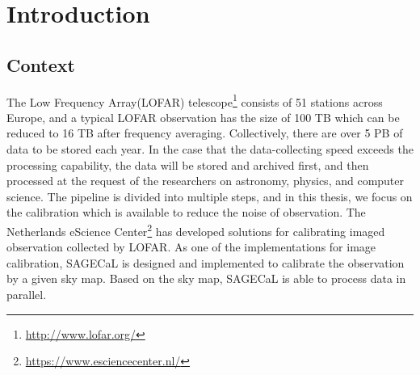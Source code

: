 
\chapter{Introduction}

\ifpdf
    \graphicspath{{1_introduction/figures/PNG/}{1_introduction/figures/PDF/}{1_introduction/figures/}}
\else
    \graphicspath{{1_introduction/figures/EPS/}{1_introduction/figures/}}
\fi







\section{Context} \label{section:intro.contex}
The Low Frequency Array(LOFAR) telescope\footnote{\url{http://www.lofar.org/}} consists of 51 stations across Europe, and a typical LOFAR observation has the size of 100 TB which can be reduced to 16 TB after frequency averaging\cite{Spreeuw2019}.
Collectively, there are over 5 PB of data to be stored each year\cite{Start2020}. 
In the case that the data-collecting speed exceeds the processing capability, the data will be stored and archived first, and then processed at the request of the researchers on astronomy, physics, and computer science. 
The pipeline is divided into multiple steps, and in this thesis, we focus on the calibration which is available to reduce the noise of observation. 
The Netherlands eScience Center\footnote{\url{https://www.esciencecenter.nl/}} has developed solutions for calibrating imaged observation collected by LOFAR. 
As one of the implementations for image calibration, SAGECaL is designed and implemented to calibrate the observation by a given sky map\cite{Kazemi2011}.
Based on the sky map, SAGECaL is able to process data in parallel.

